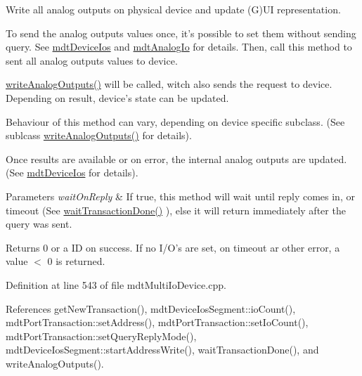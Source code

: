 Write all analog outputs on physical device and update (G)U\-I representation. 

To send the analog outputs values once, it's possible to set them without sending query. See \hyperlink{classmdt_device_ios}{mdt\-Device\-Ios} and \hyperlink{classmdt_analog_io}{mdt\-Analog\-Io} for details. Then, call this method to sent all analog outputs values to device.

\hyperlink{classmdt_multi_io_device_ac6b1b24b8c3eb0722df4079df11e6b71}{write\-Analog\-Outputs()} will be called, witch also sends the request to device. Depending on result, device's state can be updated.

Behaviour of this method can vary, depending on device specific subclass. (See sublcass \hyperlink{classmdt_multi_io_device_ac6b1b24b8c3eb0722df4079df11e6b71}{write\-Analog\-Outputs()} for details).

Once results are available or on error, the internal analog outputs are updated. (See \hyperlink{classmdt_device_ios}{mdt\-Device\-Ios} for details).


\begin{DoxyParams}{Parameters}
{\em wait\-On\-Reply} & If true, this method will wait until reply comes in, or timeout (See \hyperlink{classmdt_multi_io_device_a37a3f39a36b3bbd383f4f704193e3955}{wait\-Transaction\-Done()} ), else it will return immediately after the query was sent. \\
\hline
\end{DoxyParams}
\begin{DoxyReturn}{Returns}
0 or a I\-D on success. If no I/\-O's are set, on timeout ar other error, a value $<$ 0 is returned. 
\end{DoxyReturn}


Definition at line 543 of file mdt\-Multi\-Io\-Device.\-cpp.



References get\-New\-Transaction(), mdt\-Device\-Ios\-Segment\-::io\-Count(), mdt\-Port\-Transaction\-::set\-Address(), mdt\-Port\-Transaction\-::set\-Io\-Count(), mdt\-Port\-Transaction\-::set\-Query\-Reply\-Mode(), mdt\-Device\-Ios\-Segment\-::start\-Address\-Write(), wait\-Transaction\-Done(), and write\-Analog\-Outputs().

